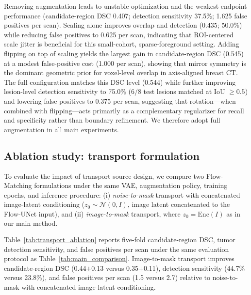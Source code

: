 \documentclass{iopjournal}
\begin{document}
Removing augmentation leads to unstable optimization and the weakest endpoint performance (candidate-region DSC 0.407; detection sensitivity 37.5\%; 1.625 false positives per scan). Scaling alone improves overlap and detection (0.435; 50.0\%) while reducing false positives to 0.625 per scan, indicating that ROI-centered scale jitter is beneficial for this small-cohort, sparse-foreground setting. Adding flipping on top of scaling yields the largest gain in candidate-region DSC (0.545) at a modest false-positive cost (1.000 per scan), showing that mirror symmetry is the dominant geometric prior for voxel-level overlap in axis-aligned breast CT. The full configuration matches this DSC level (0.544) while further improving lesion-level detection sensitivity to 75.0\% (6/8 test lesions matched at IoU $\ge 0.5$) and lowering false positives to 0.375 per scan, suggesting that rotation---when combined with flipping---acts primarily as a complementary regularizer for recall and specificity rather than boundary refinement. We therefore adopt full augmentation in all main experiments.
\subsection{Ablation study: transport formulation}\label{sec:transport_ablation}
To evaluate the impact of transport source design, we compare two Flow-Matching formulations under the same VAE, augmentation policy, training epochs, and inference procedure: (i) \emph{noise-to-mask} transport with concatenated image-latent conditioning ($z_0\sim\mathcal{N}(0,I)$, image latent concatenated to the Flow-UNet input), and (ii) \emph{image-to-mask} transport, where $z_0=\mathrm{Enc}(I)$ as in our main method.

Table~\ref{tab:transport_ablation} reports five-fold candidate-region DSC, tumor detection sensitivity, and false positives per scan under the same evaluation protocol as Table~\ref{tab:main_comparison}. Image-to-mask transport improves candidate-region DSC (0.44$\pm$0.13 versus 0.35$\pm$0.11), detection sensitivity (44.7\% versus 23.8\%), and false positives per scan (1.5 versus 2.7) relative to noise-to-mask with concatenated image-latent conditioning.
\end{document}
